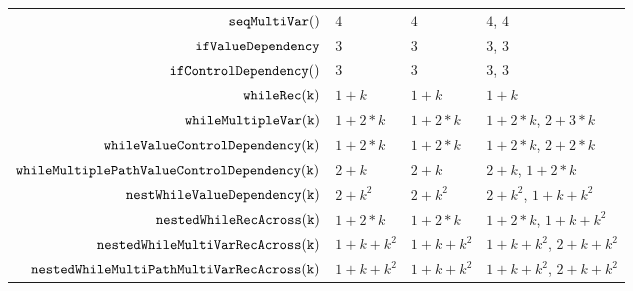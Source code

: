 \begin {table}[H]
\begin{center}
{\begin{tabular}{ r | p{12mm} p{55mm} p{\textwidth}}
         $\mathtt{seqMultiVar()}$ & $4$ & $4$ & $4$, $4$ \\  
         $ \mathtt{ifValueDependency}$ & $3$ & $3$ & $3$, $3$ \\
         $\mathtt{ifControlDependency()}$ & $3$ & $3$ & $3$, $3$  \\
         $ \mathtt{whileRec(k)}$ & $1+k$ & $1+k$ & $1+k$  \\
         $ \mathtt{whileMultipleVar(k)}$ & $1 + 2*k$ & $1 + 2*k$ & $1 + 2*k$, $2 + 3 * k$  \\
         $ \mathtt{whileValueControlDependency(k)}$ & $1 + 2*k$ & $1 + 2*k$ & $1 + 2 * k$, $2 + 2 * k$  \\
         $ \mathtt{whileMultiplePathValueControlDependency(k)}$ & $2 + k$ & $2 + k$  & $2 + k$, $1 + 2 * k$   \\
         $ \mathtt{nestWhileValueDependency(k)}$ & $2 + k^2$ & $2 + k^2$  & $2 + k^2$, $1 + k + k^2$   \\
         $ \mathtt{nestedWhileRecAcross(k)}$ & $1 + 2*k$ & $1 + 2*k$ & $1 + 2*k$,  $1 + k + k^2$   \\
         $ \mathtt{nestedWhileMultiVarRecAcross(k)}$ & $1 + k + k^2$ & $1 + k + k^2$  & $1 + k + k^2$,  $2 + k + k^2$  \\
         $ \mathtt{nestedWhileMultiPathMultiVarRecAcross(k)}$ & $1 + k + k^2$ & $1 + k + k^2$  & $1 + k + k^2$,  $2 + k + k^2$  \\
        \end{tabular}
}        
\end{center}
\end{table}

